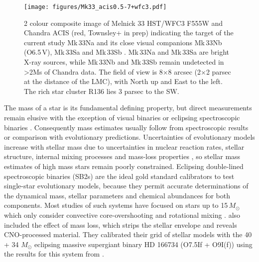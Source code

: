 \documentclass[fleqn,usenatbib]{mnras}
\begin{document}
\begin{figure}
\begin{center}
		\texttt{[image: figures/Mk33\_acis0.5-7+wfc3.pdf]}
		\end{center}
    \caption{2 colour composite image of Melnick 33 HST/WFC3 F555W \citep[green][]{deMarchi2011} and Chandra ACIS (red, Townsley+ in prep) indicating the target of the current study Mk\,33Na and its close visual companions Mk\,33Nb (O6.5\,V), Mk\,33Sa \citep[O3\,III(f*),][]{massey2005} and Mk\,33Sb \citep[WC4+OB,][]{smith1990}. %
    Mk\,33Na and Mk\,33Sa are bright X-ray sources, while Mk\,33Nb and Mk\,33Sb remain undetected in >2Ms of Chandra data.
    The field of view is 8$\times$8 arcsec (2$\times$2 parsec at the distance of the LMC), with North up and East to the left. The rich star cluster R136 lies 3 parsec to the SW.}
    \label{f:Mk33}
\end{figure}

The mass of a star is its fundamental defining property, but direct measurements remain elusive with the  exception of visual binaries or eclipsing spectroscopic binaries \citep{andersen1991, serenelli2021}.
Consequently mass estimates usually follow from spectroscopic results or comparison with evolutionary predictions. 
Uncertainties of evolutionary models increase with stellar mass \citep[e.g][]{martins2013} due to uncertainties in nuclear reaction rates, stellar structure, internal mixing processes and mass-loss properties \citep{langer2012}, so stellar mass estimates of high mass stars remain poorly constrained. Eclipsing double-lined spectroscopic binaries (SB2s) are the ideal gold standard calibrators to test single-star evolutionary models, because they permit accurate determinations of the dynamical mass, stellar parameters and chemical abundances for both components. Most studies of such systems have  focused on stars up to 15\,$M_{\odot}$ which only consider convective core-overshooting and rotational mixing \citep[e.g.][]{southworth2004, tkachenko2014, pavlovski2018}. \cite{higgins2019} also included the effect of mass loss, which strips the stellar envelope and reveals CNO-processed material. They calibrated their grid of stellar models with the 40 + 34 $M_{\odot}$ eclipsing massive supergiant binary HD 166734 (O7.5If + O9I(f)) using the results for this system from \cite{mahy2017}.
\end{document}
